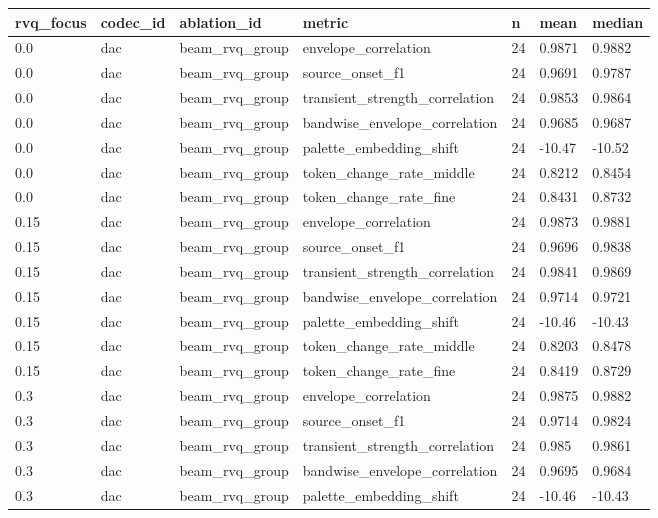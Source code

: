 \begin{table}[t]
\centering
\small
\begin{tabular}{lllllll}
\toprule
rvq\_focus & codec\_id & ablation\_id & metric & n & mean & median \\
\midrule
0.0 & dac & beam\_rvq\_group & envelope\_correlation & 24 & 0.9871 & 0.9882 \\
0.0 & dac & beam\_rvq\_group & source\_onset\_f1 & 24 & 0.9691 & 0.9787 \\
0.0 & dac & beam\_rvq\_group & transient\_strength\_correlation & 24 & 0.9853 & 0.9864 \\
0.0 & dac & beam\_rvq\_group & bandwise\_envelope\_correlation & 24 & 0.9685 & 0.9687 \\
0.0 & dac & beam\_rvq\_group & palette\_embedding\_shift & 24 & -10.47 & -10.52 \\
0.0 & dac & beam\_rvq\_group & token\_change\_rate\_middle & 24 & 0.8212 & 0.8454 \\
0.0 & dac & beam\_rvq\_group & token\_change\_rate\_fine & 24 & 0.8431 & 0.8732 \\
0.15 & dac & beam\_rvq\_group & envelope\_correlation & 24 & 0.9873 & 0.9881 \\
0.15 & dac & beam\_rvq\_group & source\_onset\_f1 & 24 & 0.9696 & 0.9838 \\
0.15 & dac & beam\_rvq\_group & transient\_strength\_correlation & 24 & 0.9841 & 0.9869 \\
0.15 & dac & beam\_rvq\_group & bandwise\_envelope\_correlation & 24 & 0.9714 & 0.9721 \\
0.15 & dac & beam\_rvq\_group & palette\_embedding\_shift & 24 & -10.46 & -10.43 \\
0.15 & dac & beam\_rvq\_group & token\_change\_rate\_middle & 24 & 0.8203 & 0.8478 \\
0.15 & dac & beam\_rvq\_group & token\_change\_rate\_fine & 24 & 0.8419 & 0.8729 \\
0.3 & dac & beam\_rvq\_group & envelope\_correlation & 24 & 0.9875 & 0.9882 \\
0.3 & dac & beam\_rvq\_group & source\_onset\_f1 & 24 & 0.9714 & 0.9824 \\
0.3 & dac & beam\_rvq\_group & transient\_strength\_correlation & 24 & 0.985 & 0.9861 \\
0.3 & dac & beam\_rvq\_group & bandwise\_envelope\_correlation & 24 & 0.9695 & 0.9684 \\
0.3 & dac & beam\_rvq\_group & palette\_embedding\_shift & 24 & -10.46 & -10.43 \\

\end{tabular}
\end{table}
